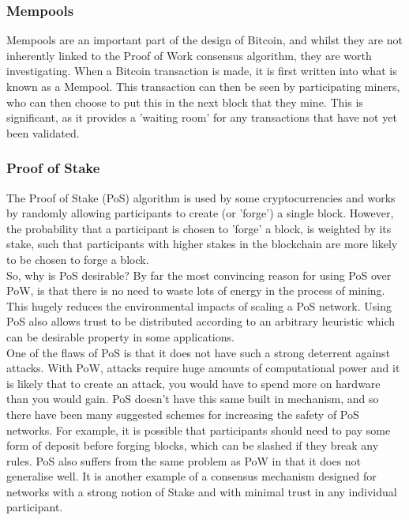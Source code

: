 \documentclass[12pt,a4paper,twoside,openright]{report}
\begin{document}
			\subsubsection*{Mempools}
			Mempools are an important part of the design of Bitcoin, and whilst they are not inherently linked to the Proof of Work consensus algorithm, they are worth investigating. 
			When a Bitcoin transaction is made, it is first written into what is known as a Mempool. 
			This transaction can then be seen by participating miners, who can then choose to put this in the next block that they mine. 
			This is significant, as it provides a 'waiting room' for any transactions that have not yet been validated.  

			\subsubsection*{Proof of Stake}
			The Proof of Stake (PoS) algorithm is used by some cryptocurrencies and works by randomly allowing participants to create (or 'forge') a single block.
			However, the probability that a participant is chosen to 'forge' a block, is weighted by its stake, such that participants with higher stakes in the blockchain are more likely to be chosen to forge a block.\\

			So, why is PoS desirable? 
			By far the most convincing reason for using PoS over PoW, is that there is no need to waste lots of energy in the process of mining. 
			This hugely reduces the environmental impacts of scaling a PoS network.
			Using PoS also allows trust to be distributed according to an arbitrary heuristic which can be desirable property in some applications.\\

			One of the flaws of PoS is that it does not have such a strong deterrent against attacks.
			With PoW, attacks require huge amounts of computational power and it is likely that to create an attack, you would have to spend more on hardware than you would gain. 
			PoS doesn't have this same built in mechanism, and so there have been many suggested schemes for increasing the safety of PoS networks.
			For example, it is possible that participants should need to pay some form of deposit before forging blocks, which can be slashed if they break any rules. 
			PoS also suffers from the same problem as PoW in that it does not generalise well. 
			It is another example of a consensus mechanism designed for networks with a strong notion of Stake and with minimal trust in any individual participant.
\end{document}
